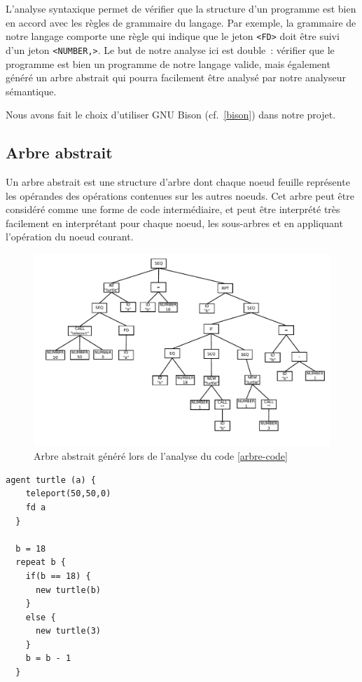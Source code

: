 L'analyse syntaxique permet de vérifier que la structure d'un programme est bien en accord avec les règles de grammaire du langage. Par exemple, la grammaire de notre langage comporte une règle qui indique que le jeton \verb|<FD>| doit être suivi d'un jeton \verb|<NUMBER,>|. Le but de notre analyse ici est double~: vérifier que le programme est bien un programme de notre langage valide, mais également généré un arbre abstrait qui pourra facilement être analysé par notre analyseur sémantique.

Nous avons fait le choix d'utiliser GNU Bison (cf.~\ref{bison}) dans notre projet.

\subsection{Arbre abstrait}
Un arbre abstrait est une structure d'arbre dont chaque noeud feuille représente les opérandes des opérations contenues sur les autres noeuds. Cet arbre peut être considéré comme une forme de code intermédiaire, et peut être interprété très facilement en interprétant pour chaque noeud, les sous-arbres et en appliquant l'opération du noeud courant.

\begin{figure}[h!]
\centering
\includegraphics[scale=0.8]{doc/report/img/arbre-abstrait}
\caption{\label{arbre-abstrait} Arbre abstrait généré lors de l'analyse du code \ref{arbre-code}}
\end{figure}
\begin{lstlisting}[language=Stibbons,label=arbre-code,caption=Exemple de code Stibbons]
  agent turtle (a) {
    teleport(50,50,0)
    fd a
  }

  b = 18
  repeat b {
    if(b == 18) {
      new turtle(b)
    }
    else {
      new turtle(3)
    }
    b = b - 1
  }
\end{lstlisting}

